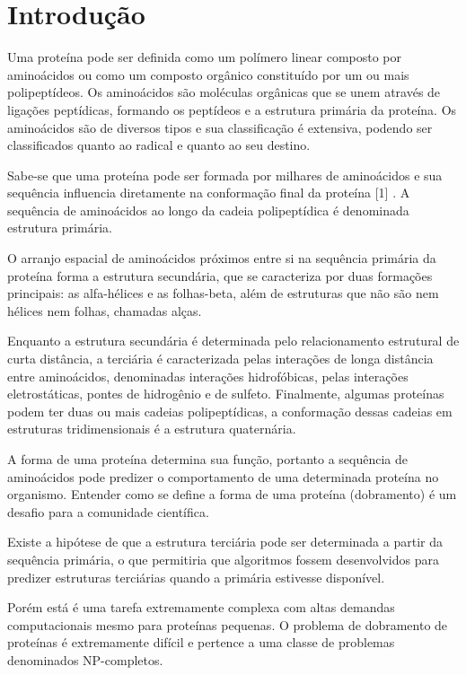 \documentclass[dm,ppgcomp]{texfurg}
\begin{document}
\tableofcontents

\chapter{Introdução}

Uma proteína pode ser definida como um polímero linear composto por aminoácidos  ou como um composto orgânico constituído por um ou mais polipeptídeos. Os aminoácidos são moléculas orgânicas que se unem através de ligações peptídicas, formando os peptídeos e a estrutura primária da proteína. Os aminoácidos são de diversos tipos e sua classificação é extensiva, podendo ser classificados quanto ao radical e quanto ao seu destino.

Sabe-se que uma proteína pode ser formada por milhares de aminoácidos e sua sequência influencia diretamente na conformação final da proteína [1] . A sequência de aminoácidos ao longo da cadeia polipeptídica é denominada estrutura primária. 

O arranjo espacial de aminoácidos próximos entre si na sequência primária da proteína forma a estrutura secundária, que se caracteriza por duas formações principais: as alfa-hélices e as folhas-beta, além de estruturas que não são nem hélices nem folhas, chamadas alças. 

Enquanto a estrutura secundária é determinada pelo relacionamento estrutural de curta distância, a terciária é caracterizada pelas interações de longa distância entre aminoácidos, denominadas interações hidrofóbicas, pelas interações eletrostáticas, pontes de hidrogênio e de sulfeto.
Finalmente, algumas proteínas podem ter duas ou mais cadeias polipeptídicas, a conformação dessas cadeias em estruturas tridimensionais é a estrutura quaternária.

A forma de uma proteína determina sua função, portanto a sequência de aminoácidos pode predizer o comportamento de uma determinada proteína no organismo. Entender como se define a forma de uma proteína (dobramento) é um desafio para a comunidade científica.

Existe a hipótese de que a estrutura terciária pode ser determinada a partir da  sequência primária, o que permitiria que algoritmos fossem desenvolvidos para predizer estruturas terciárias quando a primária estivesse disponível. 

Porém está é uma tarefa extremamente complexa com altas demandas computacionais mesmo para proteínas pequenas. O problema de dobramento de proteínas é extremamente difícil e pertence a uma classe de problemas denominados NP-completos.
\end{document}
